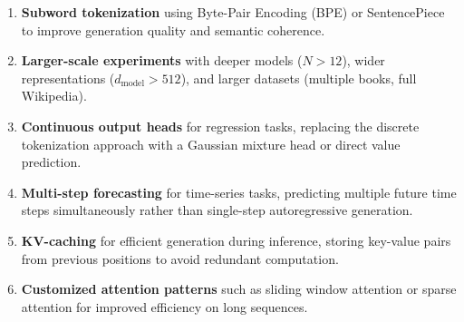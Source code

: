 \documentclass[conference]{IEEEtran}
\begin{document}
\begin{enumerate}
    \item \textbf{Subword tokenization} using Byte-Pair Encoding (BPE) or SentencePiece to improve generation quality and semantic coherence.
    \item \textbf{Larger-scale experiments} with deeper models ($N > 12$), wider representations ($d_{\text{model}} > 512$), and larger datasets (multiple books, full Wikipedia).
    \item \textbf{Continuous output heads} for regression tasks, replacing the discrete tokenization approach with a Gaussian mixture head or direct value prediction.
    \item \textbf{Multi-step forecasting} for time-series tasks, predicting multiple future time steps simultaneously rather than single-step autoregressive generation.
    \item \textbf{KV-caching} for efficient generation during inference, storing key-value pairs from previous positions to avoid redundant computation.
    \item \textbf{Customized attention patterns} such as sliding window attention or sparse attention for improved efficiency on long sequences.
\end{enumerate}
\end{document}
